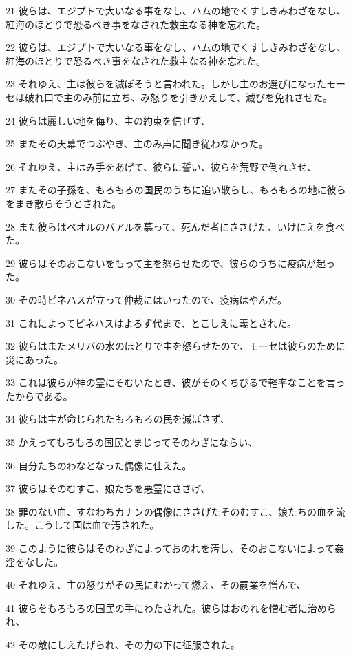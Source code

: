 \par 21 彼らは、エジプトで大いなる事をなし、ハムの地でくすしきみわざをなし、紅海のほとりで恐るべき事をなされた救主なる神を忘れた。
\par 22 彼らは、エジプトで大いなる事をなし、ハムの地でくすしきみわざをなし、紅海のほとりで恐るべき事をなされた救主なる神を忘れた。
\par 23 それゆえ、主は彼らを滅ぼそうと言われた。しかし主のお選びになったモーセは破れ口で主のみ前に立ち、み怒りを引きかえして、滅びを免れさせた。
\par 24 彼らは麗しい地を侮り、主の約束を信ぜず、
\par 25 またその天幕でつぶやき、主のみ声に聞き従わなかった。
\par 26 それゆえ、主はみ手をあげて、彼らに誓い、彼らを荒野で倒れさせ、
\par 27 またその子孫を、もろもろの国民のうちに追い散らし、もろもろの地に彼らをまき散らそうとされた。
\par 28 また彼らはペオルのバアルを慕って、死んだ者にささげた、いけにえを食べた。
\par 29 彼らはそのおこないをもって主を怒らせたので、彼らのうちに疫病が起った。
\par 30 その時ピネハスが立って仲裁にはいったので、疫病はやんだ。
\par 31 これによってピネハスはよろず代まで、とこしえに義とされた。
\par 32 彼らはまたメリバの水のほとりで主を怒らせたので、モーセは彼らのために災にあった。
\par 33 これは彼らが神の霊にそむいたとき、彼がそのくちびるで軽率なことを言ったからである。
\par 34 彼らは主が命じられたもろもろの民を滅ぼさず、
\par 35 かえってもろもろの国民とまじってそのわざにならい、
\par 36 自分たちのわなとなった偶像に仕えた。
\par 37 彼らはそのむすこ、娘たちを悪霊にささげ、
\par 38 罪のない血、すなわちカナンの偶像にささげたそのむすこ、娘たちの血を流した。こうして国は血で汚された。
\par 39 このように彼らはそのわざによっておのれを汚し、そのおこないによって姦淫をなした。
\par 40 それゆえ、主の怒りがその民にむかって燃え、その嗣業を憎んで、
\par 41 彼らをもろもろの国民の手にわたされた。彼らはおのれを憎む者に治められ、
\par 42 その敵にしえたげられ、その力の下に征服された。

